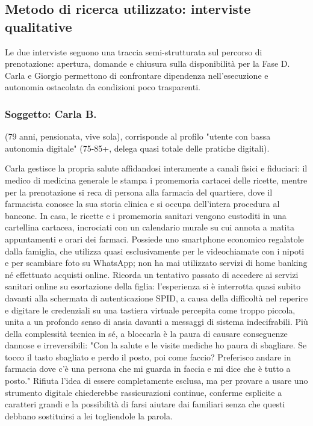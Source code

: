 \subsection[Interviste qualitative]{Metodo di ricerca utilizzato: interviste qualitative}

Le due interviste seguono una traccia semi-strutturata sul
percorso di prenotazione: apertura, domande e chiusura sulla disponibilità
per la Fase D. Carla e Giorgio permettono di confrontare dipendenza
nell'esecuzione e autonomia ostacolata da condizioni poco trasparenti.

\subsubsection{Soggetto: Carla B.}
\noindent (79 anni, pensionata, vive sola), corrisponde al profilo
"utente con bassa autonomia digitale" (75-85+, delega quasi totale
delle pratiche digitali).

Carla gestisce la propria salute affidandosi interamente a canali fisici e fiduciari:
il medico di medicina generale le stampa i promemoria cartacei delle ricette, mentre per la
prenotazione si reca di persona alla farmacia del quartiere, dove il farmacista
conosce la sua storia clinica e si occupa dell'intera procedura al bancone. In casa,
le ricette e i promemoria sanitari vengono custoditi in una cartellina cartacea, incrociati con
un calendario murale su cui annota a matita appuntamenti e orari dei farmaci.
Possiede uno smartphone economico regalatole dalla famiglia, che utilizza quasi esclusivamente
per le videochiamate con i nipoti e per scambiare foto su WhatsApp; non ha mai utilizzato
servizi di home banking né effettuato acquisti online. Ricorda un tentativo passato di
accedere ai servizi sanitari online su esortazione della figlia: l'esperienza si è
interrotta quasi subito davanti alla schermata di autenticazione SPID, a causa della
difficoltà nel reperire e digitare le credenziali su una tastiera virtuale percepita come
troppo piccola, unita a un profondo senso di ansia davanti a messaggi di sistema indecifrabili.
Più della complessità tecnica in sé, a bloccarla è la paura di causare conseguenze
dannose e irreversibili: "Con la salute e le visite mediche ho paura di sbagliare. Se tocco
il tasto sbagliato e perdo il posto, poi come faccio? Preferisco andare in farmacia dove c'è
una persona che mi guarda in faccia e mi dice che è tutto a posto." Rifiuta l'idea di essere
completamente esclusa, ma per provare a usare uno strumento digitale chiederebbe rassicurazioni
continue, conferme esplicite a caratteri grandi e la possibilità di farsi aiutare dai familiari
senza che questi debbano sostituirsi a lei togliendole la parola.


